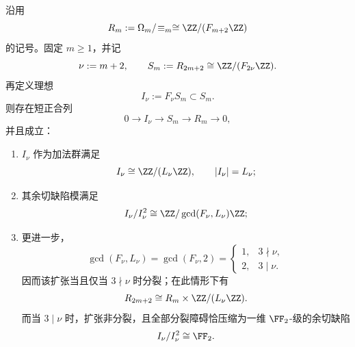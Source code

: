 \begin{theorem}\label{thm:xi-time-part51aa-doubling-lucas-extension}
沿用
\[
R_m:=\Omega_m/\!\equiv_m\cong \ZZ/(F_{m+2}\ZZ)
\]
的记号。固定 \(m\ge 1\)，并记
\[
\nu:=m+2,
\qquad
S_m:=R_{2m+2}\cong \ZZ/(F_{2\nu}\ZZ).
\]
再定义理想
\[
I_\nu:=F_\nu S_m\subset S_m.
\]
则存在短正合列
\[
0\longrightarrow I_\nu\longrightarrow S_m\longrightarrow R_m\longrightarrow 0,
\]
并且成立：
\begin{enumerate}
  \item \(I_\nu\) 作为加法群满足
  \[
  I_\nu\cong \ZZ/(L_\nu\ZZ),
  \qquad
  |I_\nu|=L_\nu;
  \]
  \item 其余切缺陷模满足
  \[
  I_\nu/I_\nu^2\cong \ZZ/\gcd(F_\nu,L_\nu)\ZZ;
  \]
  \item 更进一步，
  \[
  \gcd(F_\nu,L_\nu)=\gcd(F_\nu,2)=
  \begin{cases}
  1,& 3\nmid \nu,\\
  2,& 3\mid \nu.
  \end{cases}
  \]
  因而该扩张当且仅当 \(3\nmid \nu\) 时分裂；在此情形下有
  \[
  R_{2m+2}\cong R_m\times \ZZ/(L_\nu\ZZ).
  \]
  而当 \(3\mid \nu\) 时，扩张非分裂，且全部分裂障碍恰压缩为一维 \(\FF_2\)-级的余切缺陷
  \[
  I_\nu/I_\nu^2\cong \FF_2.
  \]
\end{enumerate}
\end{theorem}
